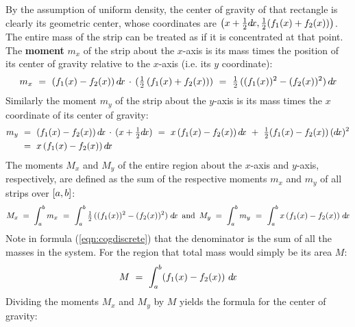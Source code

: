 By the assumption of uniform density, the center of gravity of that rectangle is
clearly its geometric center, whose coordinates are
$\left(x+\frac{1}{2}d\!x,\frac{1}{2}(f_1(x)+f_2(x))\right)$. The entire mass of
the strip can be treated as if it is concentrated at that point. The
\textbf{moment} $m_x$ of the strip about the $x$-axis is its mass times the
position of its center of gravity relative to the $x$-axis (i.e. its $y$
coordinate):
\[
m_x ~=~ (f_1(x)-f_2(x))\,d\!x\,\cdot\,(\tfrac{1}{2}\,(f_1(x)+f_2(x))) ~=~
\tfrac{1}{2}\,((f_1(x))^2 - (f_2(x))^2)\,d\!x
\]
Similarly the moment $m_y$ of the strip about the $y$-axis is its mass times the
$x$ coordinate of its center of gravity:
\begin{align*}
m_y ~&=~ (f_1(x)-f_2(x))\,d\!x\,\cdot\,(x+\tfrac{1}{2}d\!x) ~=~
        x\,(f_1(x)-f_2(x))\,d\!x ~+~ \tfrac{1}{2} (f_1(x)-f_2(x))\,(d\!x)^2\\
~&=~ x\,(f_1(x)-f_2(x))\,d\!x
\end{align*}
The moments $M_x$ and $M_y$ of the entire region about the $x$-axis and
$y$-axis, respectively, are defined as the sum of the respective moments
$m_x$ and $m_y$ of all strips over $\lbrack a,b \rbrack$:
\[
M_x \;=\; \int_a^b m_x ~=~ \int_a^b \tfrac{1}{2}\,((f_1(x))^2 - (f_2(x))^2)\;d\!x
\enskip\text{and}\enskip
M_y \;=\; \int_a^b m_y ~=~ \int_a^b x\,(f_1(x)-f_2(x))\;d\!x
\]
Note in formula (\ref{eqn:cogdiscrete}) that the denominator is the sum of all
the masses in the system. For the region that total mass would simply be its
area $M$:
\[
M ~=~ \int_a^b (f_1(x)-f_2(x))~d\!x
\]
Dividing the moments $M_x$ and $M_y$ by $M$ yields the formula for the center of
gravity:
\newpage
{}

